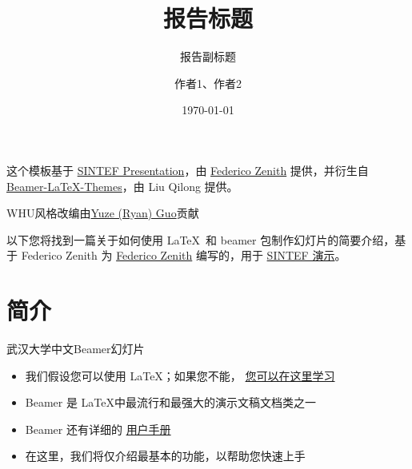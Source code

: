 \documentclass{beamer}
\title{报告标题}
\subtitle{报告副标题}
\author{作者1、作者2}
\date{\today}
\newcommand{\hrefcol}[2]{\textcolor{cyan}{\href{#1}{#2}}}
\begin{document}
\maketitle



\begin{frame}

这个模板基于 \hrefcol{https://www.overleaf.com/latex/templates/sintef-presentation/jhbhdffczpnx}{SINTEF Presentation}，由 \hrefcol{mailto:federico.zenith@sintef.no}{Federico Zenith} 提供，并衍生自 \hrefcol{https://github.com/TOB-KNPOB/Beamer-LaTeX-Themes}{Beamer-LaTeX-Themes}，由 Liu Qilong 提供。

\vspace{\baselineskip}

WHU风格改编由\hrefcol{https://github.com/ryan-gwo/WHU-Chinese-Beamer-Template}{Yuze (Ryan) Guo}贡献

\vspace{\baselineskip}

以下您将找到一篇关于如何使用 \LaTeX\ 和 beamer 包制作幻灯片的简要介绍，基于 Federico Zenith 为 \hrefcol{mailto:federico.zenith@sintef.no}{Federico Zenith} 编写的，用于 \hrefcol{https://www.overleaf.com/latex/templates/sintef-presentation/jhbhdffczpnx}{SINTEF 演示}。



\end{frame}

\section{简介}

\begin{frame}{武汉大学中文Beamer幻灯片}
\begin{itemize}
\item 我们假设您可以使用 \LaTeX；如果您不能，
\hrefcol{http://en.wikibooks.org/wiki/LaTeX/}{您可以在这里学习}
\item Beamer 是 \LaTeX 中最流行和最强大的演示文稿文档类之一
\item Beamer 还有详细的
\hrefcol{http://www.ctan.org/tex-archive/macros/latex/contrib/beamer/doc/beameruserguide.pdf}{用户手册}
\item 在这里，我们将仅介绍最基本的功能，以帮助您快速上手
\end{itemize}
\end{frame}
\end{document}
